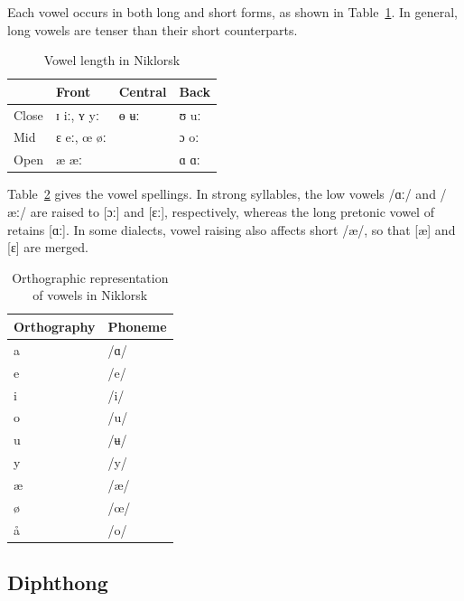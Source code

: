 Each vowel occurs in both long and short forms, as shown in Table~\ref{tab:vowel-length}. In general, long vowels are tenser than their short counterparts.

\begin{table}[!ht]
    \caption{Vowel length in Niklorsk}
    \label{tab:vowel-length}
    \begin{tabularx}{\textwidth}{X X X X}
        \toprule
        \rowcolor{grammarTableHead}
         & \textbf{Front} & \textbf{Central} & \textbf{Back} \\
        \midrule
        Close & ɪ iː, ʏ yː & ɵ ʉː & ʊ uː \\
        Mid & ɛ eː, œ øː & & ɔ oː \\
        Open & æ æː & & ɑ ɑː \\
        \bottomrule
    \end{tabularx}
\end{table}

Table~\ref{tab:vowel-orthography} gives the vowel spellings. In strong syllables, the low vowels /ɑː/ and /æː/ are raised to [ɔː] and [ɛː], respectively, whereas the long pretonic vowel of  retains [ɑː]. In some dialects, vowel raising also affects short /æ/, so that [æ] and [ɛ] are merged.

\begin{table}[!ht]
    \caption{Orthographic representation of vowels in Niklorsk}
    \label{tab:vowel-orthography}
    \begin{tabularx}{\textwidth}{X X}
        \toprule
        \rowcolor{grammarTableHead}
        \textbf{Orthography} & \textbf{Phoneme} \\
        \midrule
        a & /ɑ/ \\
        e & /e/ \\
        i & /i/ \\
        o & /u/ \\
        u & /ʉ/ \\
        y & /y/ \\
        æ & /æ/ \\
        ø & /œ/ \\
        å & /o/ \\
        \bottomrule
    \end{tabularx}
\end{table}

\subsection{Diphthong}

